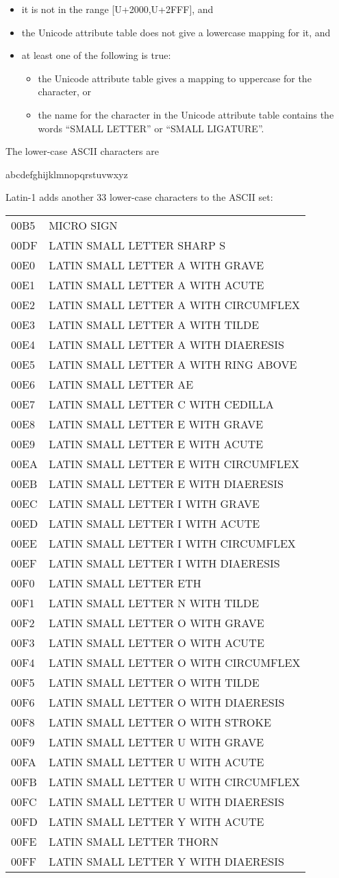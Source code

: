 \begin{itemize}
\tightlist
\item
  it is not in the range {[}U+2000,U+2FFF{]}, and
\item
  the Unicode attribute table does not give a lowercase mapping for it,
  and
\item
  at least one of the following is true:

  \begin{itemize}
  \tightlist
  \item
    the Unicode attribute table gives a mapping to uppercase for the
    character, or
  \item
    the name for the character in the Unicode attribute table contains
    the words ``SMALL LETTER'' or ``SMALL LIGATURE''.
  \end{itemize}
\end{itemize}

The lower-case ASCII characters are

abcdefghijklmnopqrstuvwxyz

Latin-1 adds another 33 lower-case characters to the ASCII set:

\begin{tabular}{ll}
00B5 & MICRO SIGN\tabularnewline
00DF & LATIN SMALL LETTER SHARP S\tabularnewline
00E0 & LATIN SMALL LETTER A WITH GRAVE\tabularnewline
00E1 & LATIN SMALL LETTER A WITH ACUTE\tabularnewline
00E2 & LATIN SMALL LETTER A WITH CIRCUMFLEX\tabularnewline
00E3 & LATIN SMALL LETTER A WITH TILDE\tabularnewline
00E4 & LATIN SMALL LETTER A WITH DIAERESIS\tabularnewline
00E5 & LATIN SMALL LETTER A WITH RING ABOVE\tabularnewline
00E6 & LATIN SMALL LETTER AE\tabularnewline
00E7 & LATIN SMALL LETTER C WITH CEDILLA\tabularnewline
00E8 & LATIN SMALL LETTER E WITH GRAVE\tabularnewline
00E9 & LATIN SMALL LETTER E WITH ACUTE\tabularnewline
00EA & LATIN SMALL LETTER E WITH CIRCUMFLEX\tabularnewline
00EB & LATIN SMALL LETTER E WITH DIAERESIS\tabularnewline
00EC & LATIN SMALL LETTER I WITH GRAVE\tabularnewline
00ED & LATIN SMALL LETTER I WITH ACUTE\tabularnewline
00EE & LATIN SMALL LETTER I WITH CIRCUMFLEX\tabularnewline
00EF & LATIN SMALL LETTER I WITH DIAERESIS\tabularnewline
00F0 & LATIN SMALL LETTER ETH\tabularnewline
00F1 & LATIN SMALL LETTER N WITH TILDE\tabularnewline
00F2 & LATIN SMALL LETTER O WITH GRAVE\tabularnewline
00F3 & LATIN SMALL LETTER O WITH ACUTE\tabularnewline
00F4 & LATIN SMALL LETTER O WITH CIRCUMFLEX\tabularnewline
00F5 & LATIN SMALL LETTER O WITH TILDE\tabularnewline
00F6 & LATIN SMALL LETTER O WITH DIAERESIS\tabularnewline
00F8 & LATIN SMALL LETTER O WITH STROKE\tabularnewline
00F9 & LATIN SMALL LETTER U WITH GRAVE\tabularnewline
00FA & LATIN SMALL LETTER U WITH ACUTE\tabularnewline
00FB & LATIN SMALL LETTER U WITH CIRCUMFLEX\tabularnewline
00FC & LATIN SMALL LETTER U WITH DIAERESIS\tabularnewline
00FD & LATIN SMALL LETTER Y WITH ACUTE\tabularnewline
00FE & LATIN SMALL LETTER THORN\tabularnewline
00FF & LATIN SMALL LETTER Y WITH DIAERESIS\tabularnewline
\end{tabular}

